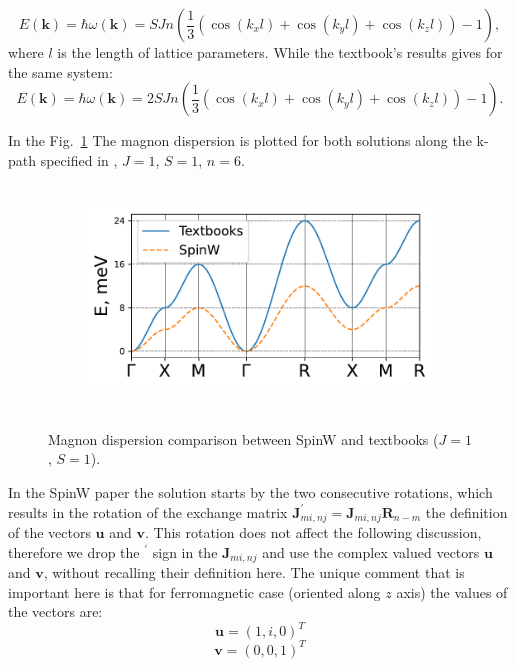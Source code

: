 \documentclass[a4paper,12pt]{article}
\begin{document}
        \begin{equation}
            E(\boldsymbol{k}) = \hbar\omega(\boldsymbol{k}) = SJn\left(\dfrac{1}{3}\left(\cos(k_xl) + \cos(k_yl) + \cos(k_zl)\right) - 1\right),
        \end{equation}
        where $l$ is the length of lattice parameters. While the textbook's results gives for the same system:
        \begin{equation}
            E(\boldsymbol{k}) = \hbar\omega(\boldsymbol{k}) = 2SJn\left(\dfrac{1}{3}\left(\cos(k_xl) + \cos(k_yl) + \cos(k_zl)\right) - 1\right). \label{eq:textbook}
        \end{equation}

        In the Fig.~\ref{fig:dispersion-comparasion} The magnon dispersion is plotted for both solutions along the k-path specified in \cite{setyawan2010high}, $J = 1$, $S = 1$, $n = 6$.

        \begin{figure}[H]
            \centering
            \begin{subfigure}[b]{0.8\textwidth}
                \centering
                \includegraphics[height=6cm]{main_dispersion.pdf}
            \end{subfigure}
            \hfill
            \caption{Magnon dispersion comparison between SpinW and textbooks ($J = 1$, $S = 1$).}
            \label{fig:dispersion-comparasion}
        \end{figure}

        In the SpinW paper \cite{toth2015linear} the solution starts by the two consecutive rotations, 
        which results in the rotation of the exchange matrix $\boldsymbol{J}^{\prime}_{mi, nj} = \boldsymbol{J}_{mi, nj}\boldsymbol{R}_{n-m}$ 
        the definition of the vectors $\boldsymbol{u}$ and $\boldsymbol{v}$.
        This rotation does not affect the following discussion, therefore we drop the $^{\prime}$ sign in the $\boldsymbol{J}_{mi, nj}$ 
        and use the complex valued vectors $\boldsymbol{u}$ and $\boldsymbol{v}$, without recalling their definition here. 
        The unique comment that is important here is that for ferromagnetic case (oriented along $z$ axis) the values of the vectors are:
        \begin{equation}
            \boldsymbol{u} = (1, i, 0)^T
        \end{equation}
        \begin{equation}
            \boldsymbol{v} = (0, 0, 1)^T
        \end{equation}
\end{document}
